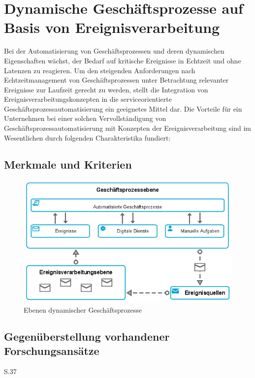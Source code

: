 \section{Dynamische Geschäftsprozesse auf Basis von Ereignisverarbeitung}\label{sec:Kombi}
Bei der Automatisierung von Geschäftsprozessen und deren dynamischen Eigenschaften wächst, der Bedarf auf kritische Ereignisse in Echtzeit und ohne Latenzen zu reagieren.
Um den steigenden Anforderungen nach Echtzeitmanagement von Geschäftsprozessen unter Betrachtung relevanter Ereignisse zur Laufzeit gerecht zu werden, stellt die Integration von Ereignisverarbeitungskonzepten in die serviceorientierte Geschäftsprozessautomatisierung ein geeignetes Mittel dar. Die Vorteile für ein Unternehmen bei einer solchen Vervollständigung von Geschäftsprozessautomatisierung mit Konzepten der Ereignisverarbeitung sind im Wesentlichen durch folgenden Charakteristika fundiert:

\subsection{Merkmale und Kriterien}

\begin{figure}[H]
	\centering 
    \includegraphics[width=\textwidth]{img/dynamicbp.png}	
    \caption[Ebenen dynamischer Geschäftsprozesse]
    {Ebenen dynamischer Geschäftsprozesse \protect\footnotemark}
    \label{fig:Ebenen dynamischer Geschäftsprozesse}
\end{figure}



\subsection{Gegenüberstellung vorhandener Forschungsansätze}

\cite{Wolf.2016}
\cite{RobraBissantz.2009}
\cite{Bruns.2010}S.37